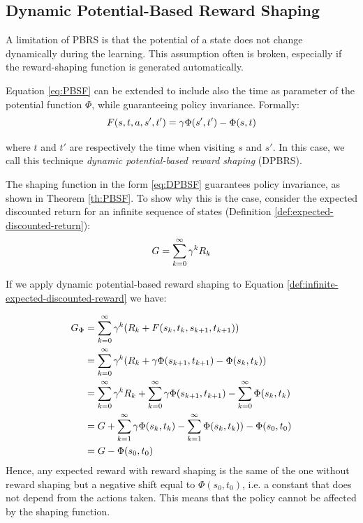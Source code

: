 \subsection{Dynamic Potential-Based Reward Shaping}\label{sect:DPBRS}
A limitation of PBRS  is that  the  potential  of  a  state  does  not  change  dynamically
during the learning.  This assumption often is broken, especially if the reward-shaping function is generated automatically.
  
Equation \ref{eq:PBSF} can be extended to include also the time as parameter of the potential function $\Phi$, while guaranteeing policy invariance. Formally:
\begin{equation}\label{eq:DPBSF}
F(s, t, a, s', t') = \gamma\Phi(s', t') - \Phi(s, t)
\end{equation}

where $t$ and $t'$ are respectively the time when visiting $s$ and $s'$. In this case, we call this technique \emph{dynamic potential-based reward shaping} (DPBRS).

The shaping function in the form \ref{eq:DPBSF} guarantees policy invariance, as shown in Theorem \ref{th:PBSF}. To show why this is the case, consider the expected discounted return for an infinite sequence of states (Definition \ref{def:expected-discounted-return}):
\begin{equation}\label{def:infinite-expected-discounted-reward}
G = \sum_{k=0}^\infty \gamma^{k}R_k
\end{equation}

If we apply dynamic potential-based reward shaping to Equation \ref{def:infinite-expected-discounted-reward} we have:

\begin{align*}
G_{\Phi} &= \sum_{k=0}^\infty \gamma^{k} (R_k + F(s_k, t_k, s_{k+1}, t_{k+1}))\\
		&= \sum_{k=0}^\infty \gamma^{k} (R_k + \gamma\Phi(s_{k+1}, t_{k+1}) - \Phi(s_{k}, t_{k}) )\\
		&= \sum_{k=0}^\infty \gamma^{k} R_k + \sum_{k=0}^\infty \gamma\Phi(s_{k+1}, t_{k+1}) - \sum_{k=0}^\infty \Phi(s_{k}, t_{k}) \\
		&= G + \sum_{k=1}^\infty \gamma\Phi(s_k, t_k) - \sum_{k=1}^\infty \Phi(s_{k}, t_{k}) ) - \Phi(s_0, t_0)\\
		&= G - \Phi(s_0, t_0)
\end{align*}
Hence, any expected reward with reward shaping is the same of the one without reward shaping but a negative shift equal to $\Phi(s_0, t_0)$, i.e. a constant that does not depend from the actions taken. This means that the policy cannot be affected by the shaping function.

